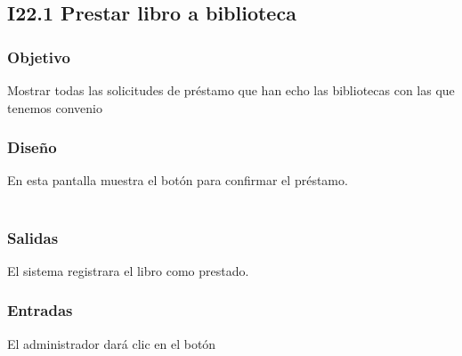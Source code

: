 \newpage
\subsection{I22.1 Prestar libro a biblioteca}

\subsubsection{Objetivo}
	Mostrar todas las solicitudes de préstamo que han echo las bibliotecas con las que tenemos convenio  

\subsubsection{Diseño}
	En esta pantalla muestra el botón  para confirmar el préstamo.  \\\\


\subsubsection{Salidas}
	\begin{Citemize}
		\item El sistema registrara el libro como prestado. 
	\end{Citemize}
	
\subsubsection{Entradas}
	\begin{Citemize}
		\item El administrador dará clic en el botón 
	\end{Citemize}



